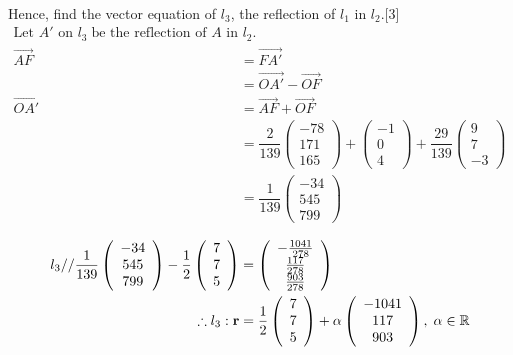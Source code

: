 \documentclass[12pt, a4 paper]{article}
\begin{document}
\begin{outline}[enumerate]
\begin{align*}
					\end{align*}
					\color{black}
					\2 Hence, find the vector equation of ${l_3}$, the reflection of ${l_1}$ in ${l_2}$.\hfill[3]
					\color{blue}
					\begin{align*}
						{\textrm{Let }}A'{\textrm{ on }}{l_3}\;{\textrm{be the reflection of }}A{\textrm{ in }}{l_2}. \\\overrightarrow {AF}  &= \overrightarrow {FA'} \\ &= \overrightarrow {OA'}  - \overrightarrow {OF}\\\overrightarrow {OA'}  &= \overrightarrow {AF}  + \overrightarrow {OF} \\ &= \dfrac{2}{{139}}\left( {\begin{array}{*{20}{c}}{ - 78}\\{171}\\{165}\end{array}} \right) + \left( {\begin{array}{*{20}{c}}{ - 1}\\0\\4\end{array}} \right) + \dfrac{{29}}{{139}}\left( {\begin{array}{*{20}{c}}9\\7\\{ - 3}\end{array}} \right)\\ &= \dfrac{1}{{139}}\left( {\begin{array}{*{20}{c}}{ - 34}\\{545}\\{799}\end{array}} \right) \\\end{align*}\begin{align*}{l_3}{\textrm{//}}\dfrac{1}{{139}}\left( {\begin{array}{*{20}{c}}{ - 34}\\{545}\\{799}\end{array}} \right) - \dfrac{1}{2}\left( {\begin{array}{*{20}{c}}7\\7\\5\end{array}} \right) &= \left( {\begin{array}{*{20}{c}}{ - \frac{{1041}}{{278}}}\\{\frac{{117}}{{278}}}\\{\frac{903}{278}}\end{array}} \right)\\\therefore {l_3}:{\bf{r}} &= \dfrac{1}{2}\left( {\begin{array}{*{20}{c}}7\\7\\5\end{array}} \right) + \alpha \left( {\begin{array}{*{20}{c}}{ - 1041}\\{117}\\{903}\end{array}} \right),\;\alpha  \in \mathbb{R}
					\end{align*}


\end{outline}
\end{document}
